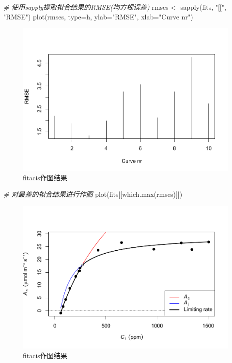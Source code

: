\documentclass[
]{krantz}
\makeatletter
\newenvironment{Shaded}{\begin{snugshade}}{\end{snugshade}}
\newcommand{\AttributeTok}[1]{\textcolor[rgb]{0.77,0.63,0.00}{#1}}
\newcommand{\CommentTok}[1]{\textcolor[rgb]{0.56,0.35,0.01}{\textit{#1}}}
\newcommand{\FunctionTok}[1]{\textcolor[rgb]{0.00,0.00,0.00}{#1}}
\newcommand{\NormalTok}[1]{#1}
\newcommand{\OtherTok}[1]{\textcolor[rgb]{0.56,0.35,0.01}{#1}}
\newcommand{\StringTok}[1]{\textcolor[rgb]{0.31,0.60,0.02}{#1}}
\newenvironment{kframe}{%
\medskip{}
\setlength{\fboxsep}{.8em}
 \def\at@end@of@kframe{}%
 \ifinner\ifhmode%
  \def\at@end@of@kframe{\end{minipage}}%
  \begin{minipage}{\columnwidth}%
 \fi\fi%
 \def\FrameCommand##1{\hskip\@totalleftmargin \hskip-\fboxsep
 \colorbox{shadecolor}{##1}\hskip-\fboxsep
     \hskip-\linewidth \hskip-\@totalleftmargin \hskip\columnwidth}%
 \MakeFramed {\advance\hsize-\width
   \@totalleftmargin\z@ \linewidth\hsize
   \@setminipage}}%
 {\par\unskip\endMakeFramed%
 \at@end@of@kframe}
\renewenvironment{Shaded}{\begin{kframe}}{\end{kframe}}
\makeatother
\begin{document}
\begin{Shaded}
\begin{Highlighting}[]
\CommentTok{\# 使用sapply提取拟合结果的RMSE(均方根误差)}
\NormalTok{rmses }\OtherTok{\textless{}{-}} \FunctionTok{sapply}\NormalTok{(fits, }\StringTok{"[["}\NormalTok{, }\StringTok{"RMSE"}\NormalTok{)}
\FunctionTok{plot}\NormalTok{(rmses, }\AttributeTok{type=}\StringTok{\textquotesingle{}h\textquotesingle{}}\NormalTok{, }\AttributeTok{ylab=}\StringTok{"RMSE"}\NormalTok{, }\AttributeTok{xlab=}\StringTok{"Curve nr"}\NormalTok{)}
\end{Highlighting}
\end{Shaded}

\begin{figure}
\centering
\includegraphics{bookdown_files/figure-latex/fitacisr-1.pdf}
\caption{\label{fig:fitacisr-1}fitacis作图结果}
\end{figure}

\begin{Shaded}
\begin{Highlighting}[]
\CommentTok{\# 对最差的拟合结果进行作图}
\FunctionTok{plot}\NormalTok{(fits[[}\FunctionTok{which.max}\NormalTok{(rmses)]])}
\end{Highlighting}
\end{Shaded}

\begin{figure}
\centering
\includegraphics{bookdown_files/figure-latex/fitacisr-2.pdf}
\caption{\label{fig:fitacisr-2}fitacis作图结果}
\end{figure}
\end{document}
